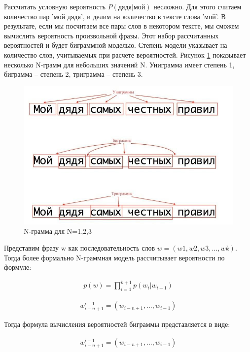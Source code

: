 Рассчитать условную вероятность $P(\text{дядя|мой})$ несложно. Для этого считаем количество пар 'мой дядя', и делим на количество в тексте слова 'мой'. 
В результате, если мы посчитаем все пары слов в некотором тексте, мы сможем вычислить вероятность произвольной фразы. 
Этот набор рассчитанных вероятностей и будет биграммной моделью. Степень модели указывает на количество слов, учитываемых при расчете вероятностей. 
Рисунок \ref{pic:speach_2} показывает несколько N-грамм для небольших значений N. Униграмма имеет степень 1, биграмма – степень 2, триграмма – степень 3.

\begin{figure}[h]
\includegraphics[width=0.75\columnwidth]{./img/speach_2.jpg}
\centering
\caption{N-грамма для N=1,2,3}
\label{pic:speach_2}
\end{figure}  

Представим фразу w как последовательность слов $w = (w1,w2,w3,…,wk)$. 
Тогда более формально N-граммная модель рассчитывает вероятности по формуле:

\begin{equation}
  \begin{gathered}
    p(w) = \prod_{i=1}^{k+1}p(w_{i}|w_{i-1})
  \end{gathered}
  \label{eq:speach_formula_3}
\end{equation}

\begin{equation}
  \begin{gathered}
    w_{i-n+1}^{i-1} = (w_{i-n+1}, ..., w_{i-1})
  \end{gathered}
  \label{eq:speach_formula_4}
\end{equation}

Тогда формула вычисления вероятностей биграммы представляется в виде:

\begin{equation}
  \begin{gathered}
    w_{i-n+1}^{i-1} = (w_{i-n+1}, ..., w_{i-1})
  \end{gathered}
  \label{eq:speach_formula_5}
\end{equation}

